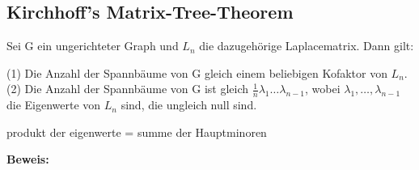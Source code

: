\graphicspath{{grafiken/}}

\subsection{Kirchhoff's Matrix-Tree-Theorem}
\begin{Tms}
Sei G ein ungerichteter Graph und $L_n$  die dazugehörige Laplacematrix. 
Dann gilt:
\par
\begingroup
\leftskip=20pt%
\rightskip=20pt
\noindent %
(1) Die Anzahl der Spannbäume von G gleich einem beliebigen Kofaktor von $L_n$.\\
(2) Die Anzahl der Spannbäume von G ist gleich $\frac{1}{n}\lambda_1\ldots\lambda_{n-1}$, wobei $\lambda_1,\ldots,\lambda_{n-1}$ die Eigenwerte von $L_n$ sind, die ungleich null sind.
\par
\endgroup
\end{Tms}

\begin{Lm}
 produkt der eigenwerte = summe der Hauptminoren
\end{Lm}

\textbf{Beweis:}
 
